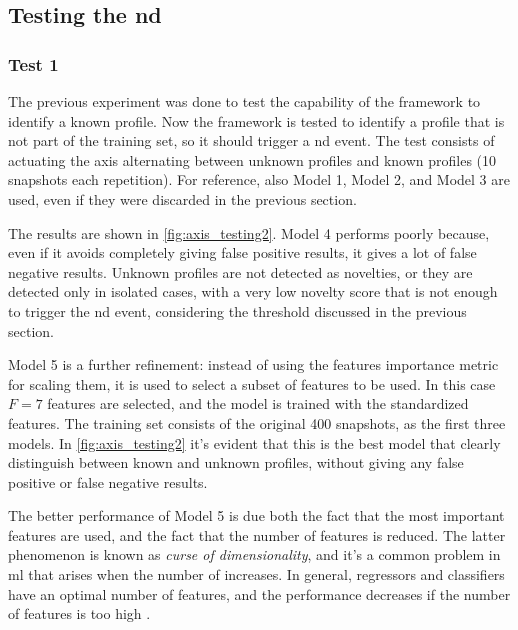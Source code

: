 \subsection{Testing the \gls{nd}}
\subsubsection{Test 1}
The previous experiment was done to test the capability of the framework to identify a known profile. Now the framework is tested to identify a profile that is not part of the training set, so it should trigger a \gls{nd} event. The test consists of actuating the axis alternating between unknown profiles and known profiles (10 snapshots each repetition). For reference, also Model 1, Model 2, and Model 3 are used, even if they were discarded in the previous section. 

The results are shown in \autoref{fig:axis_testing2}. Model 4 performs poorly because, even if it avoids completely giving false positive results, it gives a lot of false negative results. Unknown profiles are not detected as novelties, or they are detected only in isolated cases, with a very low novelty score that is not enough to trigger the \gls{nd} event, considering the threshold discussed in the previous section.

Model 5 is a further refinement: instead of using the features importance metric for scaling them, it is used to select a subset of features to be used. In this case $F=7$ features are selected, and the model is trained with the standardized features. The training set consists of the original 400 snapshots, as the first three models. In \autoref{fig:axis_testing2} it's evident that this is the best model that clearly distinguish between known and unknown profiles, without giving any false positive or false negative results.

The better performance of Model 5 is due both the fact that the most important features are used, and the fact that the number of features is reduced. The latter phenomenon is known as \emph{curse of dimensionality}, and it's a common problem in \gls{ml} that arises when the number of increases. In general, regressors and classifiers have an optimal number of features, and the performance decreases if the number of features is too high \cite{curse_dim}. 

